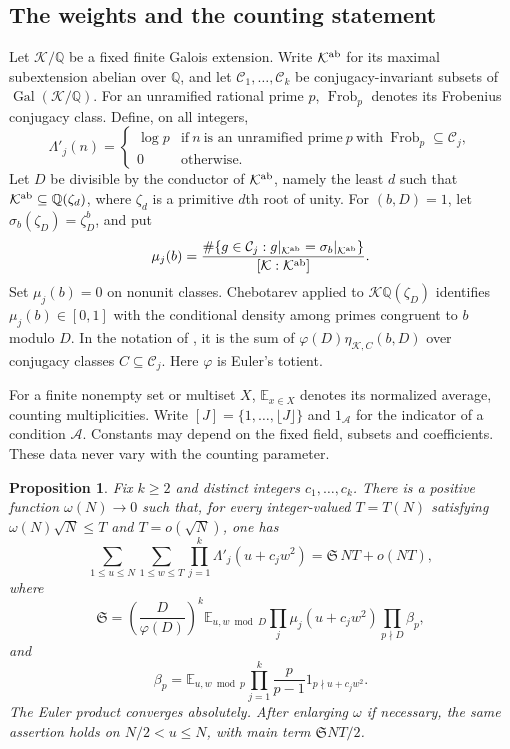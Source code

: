 \documentclass[11pt,reqno]{amsart}
\newtheorem{proposition}[theorem]{Proposition}
\theoremstyle{definition}
\numberwithin{equation}{section}
\newcommand{\Gal}{\operatorname{Gal}}
\newcommand{\Lam}{\Lambda'}
\newcommand{\Q}{\mathbb Q}
\def\t{\text}
\begin{document}
\subsection{The weights and the counting statement}
Let $\mathcal K/\Q$ be a fixed finite Galois extension. Write $\mathcal K^{\rm ab}$ for its maximal subextension abelian over $\Q$, and let $\mathcal C_1,\ldots,\mathcal C_k$ be conjugacy-invariant subsets of $\Gal(\mathcal K/\Q)$. For an unramified rational prime $p$, $\operatorname{Frob}_p$ denotes its Frobenius conjugacy class. Define, on all integers,
\[
 \Lam_j(n)=\begin{cases}\log p&\t{if}\ n\ \text{is an unramified prime}\ p\ \t{with}\ \operatorname{Frob}_p\subseteq\mathcal C_j,\\0&\text{otherwise.}\end{cases}
\]
Let $D$ be divisible by the conductor of $\mathcal K^{\rm ab}$, namely the least $d$ such that $\mathcal K^{\rm ab}\subseteq\Q(\zeta_d)$, where $\zeta_d$ is a primitive $d$th root of unity. For $(b,D)=1$, let $\sigma_b(\zeta_D)=\zeta_D^b$, and put
\begin{equation}\label{an:eq:conditionalmu}
 \mu_j(b)=\frac{\#\{g\in\mathcal C_j:
    g|_{\mathcal K^{\rm ab}}=\sigma_b|_{\mathcal K^{\rm ab}}\}}
    {[\mathcal K:\mathcal K^{\rm ab}]}.
\end{equation}
Set $\mu_j(b)=0$ on nonunit classes. Chebotarev applied to $\mathcal K\Q(\zeta_D)$ identifies $\mu_j(b)\in[0,1]$ with the conditional density among primes congruent to $b$ modulo $D$. In the notation of \cite[(1.10)--(1.12)]{FT}, it is the sum of $\varphi(D)\eta_{\mathcal K,C}(b,D)$ over conjugacy classes $C\subseteq\mathcal C_j$. Here $\varphi$ is Euler's totient.

For a finite nonempty set or multiset $X$, $\mathbb E_{x\in X}$ denotes its normalized average, counting multiplicities. Write $[J]=\{1,\ldots,\lfloor J\rfloor\}$ and $1_{\mathcal A}$ for the indicator of a condition $\mathcal A$. Constants may depend on the fixed field, subsets and coefficients. These data never vary with the counting parameter.

\begin{proposition}\label{an:prop:Artinpoly}
Fix $k\ge2$ and distinct integers $c_1,\ldots,c_k$. There is a positive function $\omega(N)\to0$ such that, for every integer-valued $T=T(N)$ satisfying
$ \omega(N)\sqrt N\le T$ and $ T=o(\sqrt N)$,
one has
\begin{equation}\label{an:eq:artinasymptotic}
 \sum_{1\le u\le N}\sum_{1\le w\le T}\prod_{j=1}^k\Lam_j(u+c_jw^2)
 =\mathfrak S\,NT+o(NT),
\end{equation}
where
\begin{equation}\label{an:eq:Artinconstant}
 \mathfrak S=
 \left(\frac D{\varphi(D)}\right)^k
 \mathbb E_{u,w\bmod D}\prod_j\mu_j(u+c_jw^2)
 \prod_{p\nmid D}\beta_p,
\end{equation}
and
\[
 \beta_p=\mathbb E_{u,w\bmod p}
    \prod_{j=1}^k\frac p{p-1}1_{p\nmid u+c_jw^2}.
\]
The Euler product converges absolutely. After enlarging $\omega$ if necessary, the same assertion holds on $N/2<u\le N$, with main term $\mathfrak S NT/2$.
\end{proposition}
\end{document}
